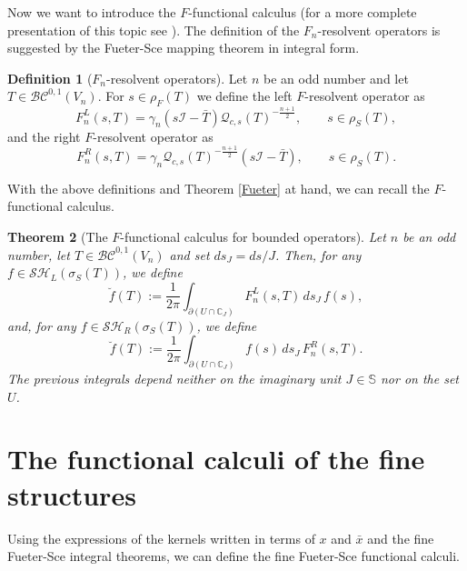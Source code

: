 \documentclass[reqno,11pt]{amsart}
\numberwithin{equation}{section}
\newtheorem{theorem}{Theorem}[section]
\theoremstyle{definition}
\newtheorem{definition}[theorem]{Definition}
\newcommand{\pp}{\partial}
\begin{document}
Now we want to introduce the $F$-functional calculus (for a more complete presentation of this topic see \cite{CG}). The definition of the $F_n$-resolvent operators is suggested by the Fueter-Sce mapping theorem in integral form.
\begin{definition}[$F_n$-resolvent operators] Let $n$ be an odd number and let $T \in \mathcal{BC}^{0,1}(V_n)$. For $s\in\rho_F(T)$ we define the left $F$-resolvent operator as
	$$ F_n^{L}(s,T)=\gamma_n(s\mathcal{I}- \bar{T}) \mathcal{Q}_{c,s}(T)^{-\frac{n+1}2}, \qquad s \in \rho_{S}(T),$$
	and the right $F$-resolvent operator as
	$$ F_n^{R}(s,T)=\gamma_n\mathcal{Q}_{c,s}(T)^{-\frac{n+1}2}(s\mathcal{I}- \bar{T}) , \qquad s \in \rho_{S}(T).$$
\end{definition}




With the above definitions and Theorem \ref{Fueter} at hand, we can recall the $F$-functional calculus.

\begin{theorem}[The $F$-functional calculus for bounded operators]
	Let $n$ be an odd number, let $T\in\mathcal{BC}^{0,1}(V_n)$ and set $ds_J=ds/J$. Then, for any $f\in \mathcal{SH}_L(\sigma_S(T))$, we define
	\begin{equation}\label{DefFCLUb}
		\breve{f}(T):=\frac{1}{2\pi}\int_{\pp(U\cap \mathbb{C}_J)} F_n^L(s,T) \, ds_J\, f(s),
	\end{equation}
	and, for any $f\in \mathcal{SH}_R(\sigma_S(T))$, we define
	\begin{equation}\label{SCalcMON}
		\breve{f}(T):=\frac{1}{2\pi}\int_{\pp(U\cap \mathbb{C}_J)} f(s) \, ds_J\, F_n^R(s,T).
	\end{equation}
	The previous integrals depend neither on the imaginary unit $J\in\mathbb S$ nor on the set $U$.
\end{theorem}




\section{The functional calculi of the fine structures }\label{FCFSTRU}


Using the expressions of the kernels written in terms of $x$ and $ \bar{x}$ and the fine Fueter-Sce integral theorems, we can define the fine Fueter-Sce functional calculi.
\end{document}
